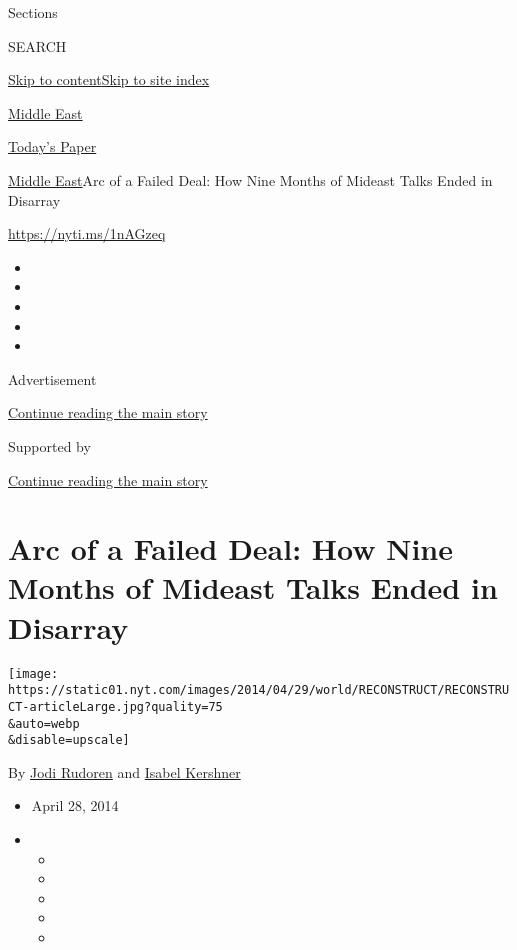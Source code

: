Sections

SEARCH

\protect\hyperlink{site-content}{Skip to
content}\protect\hyperlink{site-index}{Skip to site index}

\href{https://www.nytimes.com/section/world/middleeast}{Middle East}

\href{https://myaccount.nytimes.com/auth/login?response_type=cookie\&client_id=vi}{}

\href{https://www.nytimes.com/section/todayspaper}{Today's Paper}

\href{/section/world/middleeast}{Middle East}\textbar{}Arc of a Failed
Deal: How Nine Months of Mideast Talks Ended in Disarray

\url{https://nyti.ms/1nAGzeq}

\begin{itemize}
\item
\item
\item
\item
\item
\end{itemize}

Advertisement

\protect\hyperlink{after-top}{Continue reading the main story}

Supported by

\protect\hyperlink{after-sponsor}{Continue reading the main story}

\hypertarget{arc-of-a-failed-deal-how-nine-months-of-mideast-talks-ended-in-disarray}{%
\section{Arc of a Failed Deal: How Nine Months of Mideast Talks Ended in
Disarray}\label{arc-of-a-failed-deal-how-nine-months-of-mideast-talks-ended-in-disarray}}

\texttt{[image: https://static01.nyt.com/images/2014/04/29/world/RECONSTRUCT/RECONSTRUCT-articleLarge.jpg?quality=75\\\&auto=webp\\\&disable=upscale]}

By \href{http://www.nytimes.com/by/jodi-rudoren}{Jodi Rudoren} and
\href{https://www.nytimes.com/by/isabel-kershner}{Isabel Kershner}

\begin{itemize}
\item
  April 28, 2014
\item
  \begin{itemize}
  \item
  \item
  \item
  \item
  \item
  \end{itemize}
\end{itemize}

